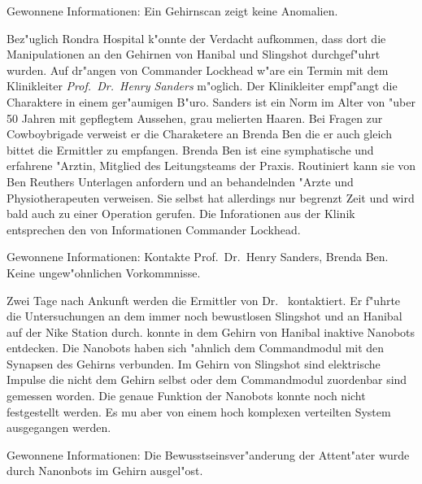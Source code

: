\begin{remarks}
	Gewonnene Informationen: Ein Gehirnscan zeigt keine Anomalien.
\end{remarks}



Bez"uglich Rondra Hospital k"onnte der Verdacht aufkommen, dass dort die Manipulationen an den Gehirnen von Hanibal und Slingshot durchgef"uhrt wurden. Auf dr"angen von Commander Lockhead w"are ein Termin mit dem Klinikleiter \emph{Prof.~Dr.~Henry Sanders} m"oglich. Der Klinikleiter empf"angt die Charaktere in einem ger"aumigen B"uro. Sanders ist ein Norm im Alter von "uber 50 Jahren mit gepflegtem Aussehen, grau melierten Haaren. Bei Fragen zur Cowboybrigade verweist er die Charaketere an Brenda Ben die er auch gleich bittet die Ermittler zu empfangen. Brenda Ben ist eine symphatische und erfahrene "Arztin, Mitglied des Leitungsteams der Praxis. Routiniert kann sie von Ben Reuthers Unterlagen anfordern und an behandelnden "Arzte und Physiotherapeuten verweisen. Sie selbst hat allerdings nur begrenzt Zeit und wird bald auch zu einer Operation gerufen. Die Inforationen aus der Klinik entsprechen den von Informationen Commander Lockhead.

\begin{remarks}
	Gewonnene Informationen: Kontakte Prof.~Dr.~Henry Sanders, Brenda Ben. Keine ungew"ohnlichen Vorkommnisse.
\end{remarks}



Zwei Tage nach Ankunft werden die Ermittler von Dr.~  kontaktiert. Er f"uhrte die Untersuchungen an dem immer noch bewustlosen Slingshot und an Hanibal auf der Nike Station durch.   konnte in dem Gehirn von Hanibal inaktive Nanobots entdecken. Die Nanobots haben sich "ahnlich dem Commandmodul mit den Synapsen des Gehirns verbunden. Im Gehirn von Slingshot sind elektrische Impulse die nicht dem Gehirn selbst oder dem Commandmodul zuordenbar sind gemessen worden. Die genaue Funktion der Nanobots konnte noch nicht festgestellt werden. Es mu\3 aber von einem hoch komplexen verteilten System ausgegangen werden.

\begin{remarks}
	Gewonnene Informationen: Die Bewusstseinsver"anderung der Attent"ater wurde durch Nanonbots im Gehirn ausgel"ost.
\end{remarks}


